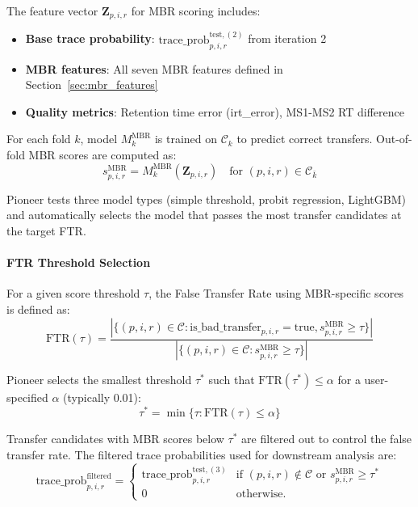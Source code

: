 \documentclass[pdflatex,sn-nature]{sn-jnl}
\begin{document}
The feature vector $\mathbf{Z}_{p,i,r}$ for MBR scoring includes:
\begin{itemize}
  \item \textbf{Base trace probability}: $\text{trace\_prob}_{p,i,r}^{\text{test},(2)}$ from iteration 2
  \item \textbf{MBR features}: All seven MBR features defined in Section~\ref{sec:mbr_features}
  \item \textbf{Quality metrics}: Retention time error (irt\_error), MS1-MS2 RT difference
\end{itemize}

For each fold $k$, model $M_k^{\text{MBR}}$ is trained on $\mathcal{C}_k$ to predict correct transfers. Out-of-fold MBR scores are computed as:
\begin{equation}
  s_{p,i,r}^{\text{MBR}} = M_k^{\text{MBR}}(\mathbf{Z}_{p,i,r}) \quad \text{for } (p,i,r) \in \mathcal{C}_{\bar{k}}
\end{equation}

Pioneer tests three model types (simple threshold, probit regression, LightGBM) and automatically selects the model that passes the most transfer candidates at the target FTR.


\paragraph{FTR Threshold Selection}\label{para:ftr-threshold-selection} 
For a given score threshold $\tau$, the False Transfer Rate using MBR-specific scores is defined as:
\begin{equation}
  \text{FTR}(\tau) = \frac{|\{(p,i,r) \in \mathcal{C} : \text{is\_bad\_transfer}_{p,i,r} = \text{true}, s_{p,i,r}^{\text{MBR}} \geq \tau\}|}{|\{(p,i,r) \in \mathcal{C} : s_{p,i,r}^{\text{MBR}} \geq \tau\}|}
\end{equation}

Pioneer selects the smallest threshold $\tau^*$ such that $\text{FTR}(\tau^*) \leq \alpha$ for a user-specified $\alpha$ (typically 0.01):
\begin{equation}
  \tau^* = \min\{\tau : \text{FTR}(\tau) \leq \alpha\}
\end{equation}

Transfer candidates with MBR scores below $\tau^*$ are filtered out to control the false transfer rate. The filtered trace probabilities used for downstream analysis are:
\begin{equation}
  \text{trace\_prob}_{p,i,r}^{\text{filtered}} = \begin{cases}
      \text{trace\_prob}_{p,i,r}^{\text{test},(3)} & \text{if } (p,i,r) \notin \mathcal{C} \text{ or } s_{p,i,r}^{\text{MBR}} \geq \tau^* \\
      0 & \text{otherwise.}
    \end{cases}
\end{equation}
\end{document}

